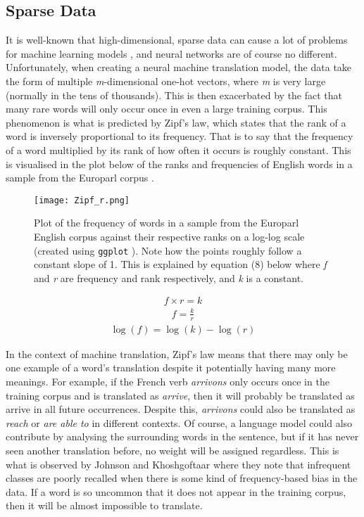 \documentclass[11pt]{article}
\begin{document}
\subsection{Sparse Data}

It is well-known that high-dimensional, sparse data can cause a lot of problems for machine learning models \citep{sparse}, and neural networks are of course no different. Unfortunately, when creating a neural machine translation model, the data take the form of multiple \textit{m}-dimensional one-hot vectors, where \textit{m} is very large (normally in the tens of thousands). This is then exacerbated by the fact that many rare words will only occur once in even a large training corpus. This phenomenon is what is predicted by Zipf’s law, which states that the rank of a word is inversely proportional to its frequency. That is to say that the frequency of a word multiplied by its rank of how often it occurs is roughly constant. This is visualised in the plot below of the ranks and frequencies of English words in a sample from the Europarl corpus \citep{koehn2005europarl}.

\begin{figure}[h]
    \centering
    \texttt{[image: Zipf\_r.png]}
    \caption{Plot of the frequency of words in a sample from the Europarl English corpus against their respective ranks on a log-log scale (created using \texttt{ggplot} \citep{ggplot}). Note how the points roughly follow a constant slope of 1. This is explained by equation (8) below where \textit{f} and \textit{r} are frequency and rank respectively, and \textit{k} is a constant.}
    \label{fig:my_label}
\end{figure}

\begin{align}
    f \times r = k \nonumber
\end{align}
\begin{align}    
    f = \frac{k}{r}
\end{align}
\begin{align}
    \log(f) = \log(k) - \log(r) \nonumber
\end{align}

\bigskip

In the context of machine translation, Zipf’s law means that there may only be one example of a word’s translation despite it potentially having many more meanings. For example, if the French verb \textit{arrivons} only occurs once in the training corpus and is translated as \textit{arrive}, then it will probably be translated as arrive in all future occurrences. Despite this, \textit{arrivons} could also be translated as \textit{reach} or \textit{are able to} in different contexts. Of course, a language model could also contribute by analysing the surrounding words in the sentence, but if it has never seen another translation before, no weight will be assigned regardless. This is what is observed by Johnson and Khoshgoftaar \citeyearpar{johnson2019survey} where they note that infrequent classes are poorly recalled when there is some kind of frequency-based bias in the data. If a word is so uncommon that it does not appear in the training corpus, then it will be almost impossible to translate.
\end{document}
